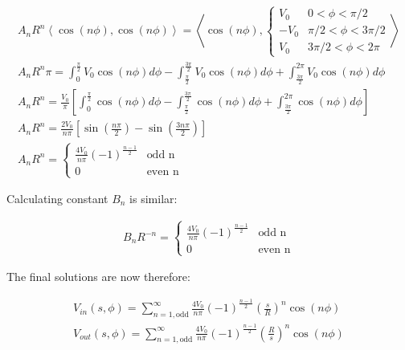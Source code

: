 \documentclass[12pt, a4paper]{article}
\begin{document}
\begin{gather}
A_n R^n \left\langle \cos(n\phi), \cos (n\phi) \right\rangle = \left\langle \cos(n\phi), \begin{cases} V_0 & 0 < \phi < \pi/2 \\ -V_0 & \pi/2 < \phi < 3\pi/2 \\ V_0 & 3\pi/2 < \phi < 2\pi \end{cases} \right\rangle \\
A_n R^n \pi = \int_0^{\frac{\pi}{2}} V_0 \cos(n\phi) d\phi - \int_{\frac{\pi}{2}}^{\frac{3\pi}{2}} V_0 \cos(n\phi) d\phi + \int_{\frac{3\pi}{2}}^{2\pi} V_0 \cos(n\phi) d\phi \\
A_n R^n = \frac{V_0}{\pi} \left[ \int_0^{\frac{\pi}{2}} \cos(n\phi) d\phi - \int_{\frac{\pi}{2}}^{\frac{3\pi}{2}} \cos(n\phi) d\phi + \int_{\frac{3\pi}{2}}^{2\pi} \cos(n\phi) d\phi \right] \\
A_n R^n = \frac{2V_0}{n\pi} \left[ \sin\left( \frac{n\pi}{2} \right) - \sin\left( \frac{3n\pi}{2} \right) \right] \\
A_n R^n = \begin{cases} \frac{4V_0}{n\pi} (-1)^{\frac{n-1}{2}} & \text{odd n} \\ 0 & \text{even n} \end{cases}
\end{gather}

Calculating constant $B_n$ is similar:

\begin{gather}
B_n R^{-n} = \begin{cases} \frac{4V_0}{n\pi} (-1)^{\frac{n-1}{2}} & \text{odd n} \\ 0 & \text{even n} \end{cases}
\end{gather}

The final solutions are now therefore:

\begin{gather}
V_{in} (s, \phi) = \sum_{n=1,\text{odd}}^\infty \frac{4V_0}{n\pi} (-1)^{\frac{n-1}{2}} \left(\frac{s}{R}\right)^n \cos (n\phi) \\
V_{out} (s, \phi) = \sum_{n=1,\text{odd}}^\infty \frac{4V_0}{n\pi} (-1)^{\frac{n-1}{2}} \left(\frac{R}{s}\right)^n \cos (n\phi)
\end{gather}
\end{document}
